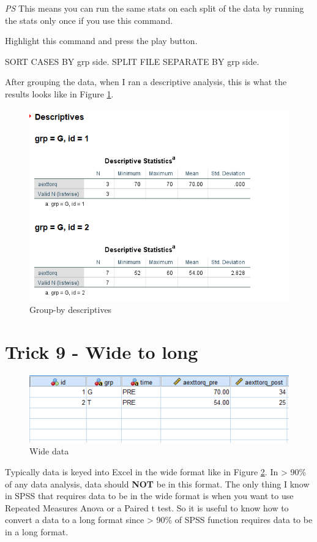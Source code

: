 \documentclass[
]{book}
\newenvironment{Shaded}{\begin{snugshade}}{\end{snugshade}}
\newcommand{\NormalTok}[1]{#1}
\begin{document}
\emph{PS} This means you can run the same stats on each split of the data by running the stats only once if you use this command.

Highlight this command and press the play button.

\begin{Shaded}
\begin{Highlighting}[]
\NormalTok{SORT CASES  BY grp side.}
\NormalTok{SPLIT FILE SEPARATE BY grp side.}
\end{Highlighting}
\end{Shaded}

After grouping the data, when I ran a descriptive analysis, this is what the results looks like in Figure \ref{fig:group-by}.

\begin{figure}
\includegraphics[width=0.6\linewidth]{images/group-by} \caption{Group-by descriptives}\label{fig:group-by}
\end{figure}

\hypertarget{trick-9---wide-to-long}{%
\chapter*{Trick 9 - Wide to long}\label{trick-9---wide-to-long}}

\begin{figure}
\includegraphics[width=1\linewidth]{images/wide_data} \caption{Wide data}\label{fig:ugly}
\end{figure}

Typically data is keyed into Excel in the wide format like in Figure \ref{fig:ugly}. In \textgreater{} 90\% of any data analysis, data should \textbf{NOT} be in this format. The only thing I know in SPSS that requires data to be in the wide format is when you want to use Repeated Measures Anova or a Paired t test. So it is useful to know how to convert a data to a long format since \textgreater{} 90\% of SPSS function requires data to be in a long format.
\end{document}
